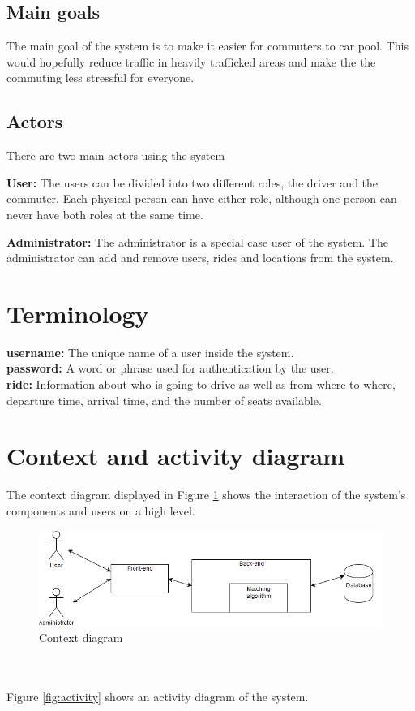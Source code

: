 \documentclass{article}
\begin{document}
\subsection{Main goals}
The main goal of the system is to make it easier for commuters to car pool. This would hopefully reduce traffic in heavily trafficked areas and make the the commuting less stressful for everyone.  
\subsection{Actors}
There are two main actors using the system

\textbf{User:} The users can be divided into two different roles, the driver and the commuter. Each physical person can have either role, although one person can never have both roles at the same time.

\textbf{Administrator:} The administrator is a special case user of the system. The administrator can add and remove users, rides and locations from the system. 

\section{Terminology}
\textbf{username:} The unique name of a user inside the system.
\\
\textbf{password:} A word or phrase used for authentication by the user.
\\
\textbf{ride:} Information about who is going to drive as well as from where to where, departure time, arrival time, and the number of seats available.

\section{Context and activity diagram}
The context diagram displayed in Figure \ref{fig:context} shows the interaction of the system's components and users on a high level.
\begin{figure}
  \centering
  \includegraphics[scale=0.45]{Contextdiagram.png}
  \caption{Context diagram}
  \label{fig:context}
\end{figure}
\\ \\ 
Figure \ref{fig:activity} shows an activity diagram of the system.
\end{document}

